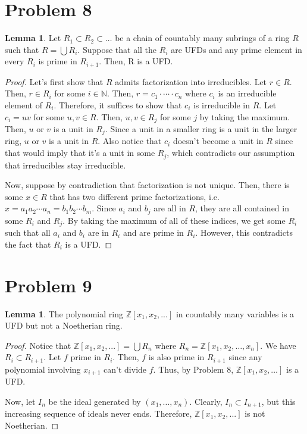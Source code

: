 \documentclass{article}
\theoremstyle{definition}
\newtheorem{lemma}[theorem]{Lemma}
\begin{document}
\section{Problem 8}

\begin{lemma}
    Let $R_{1} \subset R_{2} \subset \ldots $  be a chain of countably many subrings of a ring $R$ such that $R = \bigcup R_{i}$. Suppose that all the $R_{i}$ are UFDs and any prime element in every $R_{i}$ is prime in $R_{i+1}$. Then, R is a UFD.
\end{lemma}
\begin{proof}
    Let's first show that $ R $ admits factorization into irreducibles.
    Let $r \in R$. Then, $r \in R_{i}$ for some $i \in \mathbb{N}$. Then, $r = c_{1} \cdot \cdots \cdot c_{n}$ where $c_{i}$ is an irreducible element of $R_{i}$. Therefore, it suffices to show that $c_{i}$ is irreducible in $R$. Let $c_{i} = uv$ for some $u,v \in R$. Then, $u,v \in R_{j}$ for some $j$ by taking the maximum. Then, $u$ or $v$ is a unit in $R_{j}$. Since a unit in a smaller ring is a unit in the larger ring, $u$ or $v$ is a unit in $R$. Also notice that $c_{i}$ doesn't become a unit in $R$ since that would imply that it's a unit in some $R_{j}$, which contradicts our assumption that irreducibles stay irreducible.


    Now, suppose by contradiction that factorization is not unique. Then, there is some $x \in R$ that has two different prime factorizations, i.e. $x = a_{1}a_{2} \cdots a_{n} = b_{1}b_{2} \cdots b_{m}$. Since $a_{i}$ and $b_{j}$ are all in $R$, they are all contained in some $R_{i}$ and $R_{j}$. By taking the maximum of all of these indices, we get some $R_{i}$ such that all $a_{i}$ and $b_{i}$ are in $R_{i}$ and are prime in $R_{i}$. However, this contradicts the fact that $R_{i}$ is a UFD.
\end{proof}

\section{Problem 9}

\begin{lemma}
    The polynomial ring $\mathbb{Z}[x_{1},x_{2},...]$ in countably many variables is a UFD but not a Noetherian ring.
\end{lemma}
\begin{proof}
    Notice that $\mathbb{Z}[x_{1},x_{2},...] = \bigcup R_{n}$ where $R_{n} = \mathbb{Z}[x_{1},x_{2}, \ldots ,x_{n}]$.
    We have $R_{i} \subset R_{i+1}$. 
    Let $ f $ prime in $R_{i}$.
    Then, $ f $ is also prime in $ R_{i + 1} $ since any polynomial involving $ x_{i + 1} $ can't divide $ f $.
    Thus, by Problem 8, $\mathbb{Z}[x_{1},x_{2}, \ldots] $ is a UFD.

    Now, let $I_{n}$ be the ideal generated by $(x_{1}, \ldots ,x_{n})$. Clearly, $I_{n} \subset I_{n+1}$, but this increasing sequence of ideals never ends. Therefore, $\mathbb{Z}[x_{1},x_{2},...]$ is not Noetherian.
\end{proof}
\end{document}
